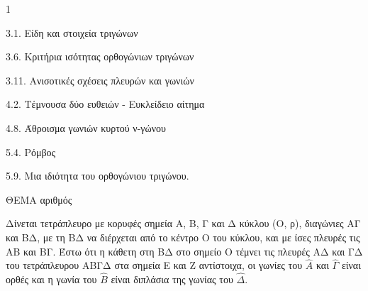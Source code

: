 \begin{ylh}{1}
    \item 3.1. Είδη και στοιχεία τριγώνων
    \item 3.6. Κριτήρια ισότητας ορθογώνιων τριγώνων
    \item 3.11. Ανισοτικές σχέσεις πλευρών και γωνιών
    \item 4.2. Τέμνουσα δύο ευθειών - Ευκλείδειο αίτημα
    \item 4.8. Άθροισμα γωνιών κυρτού ν-γώνου
    \item 5.4. Ρόμβος
    \item 5.9. Μια ιδιότητα του ορθογώνιου τριγώνου.
\end{ylh}

ΘΕΜΑ αριθμός

Δίνεται τετράπλευρο με κορυφές σημεία Α, Β, Γ και Δ κύκλου (Ο, ρ), διαγώνιες ΑΓ και ΒΔ, με τη ΒΔ να διέρχεται από το κέντρο Ο του κύκλου, και με ίσες πλευρές τις ΑΒ και ΒΓ. Έστω ότι η κάθετη στη ΒΔ στο σημείο Ο τέμνει τις πλευρές ΑΔ και ΓΔ του τετράπλευρου ΑΒΓΔ στα σημεία Ε και Ζ αντίστοιχα, οι γωνίες του $\widehat{Α}$ και $\widehat{\Gamma}$ είναι ορθές και η γωνία του $\widehat{Β}$ είναι διπλάσια της γωνίας του $\widehat{\Delta}$.

